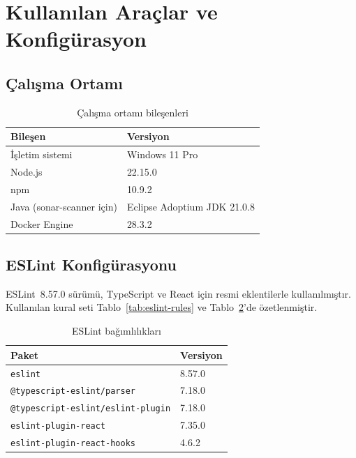 \documentclass[conference]{IEEEtran}
\begin{document}
\section{Kullanılan Araçlar ve Konfigürasyon}

\subsection{Çalışma Ortamı}

\begin{table}[htbp]
\caption{Çalışma ortamı bileşenleri}
\label{tab:env}
\centering
\begin{tabular}{@{}ll@{}}
\toprule
\textbf{Bileşen} & \textbf{Versiyon} \\
\midrule
İşletim sistemi & Windows 11 Pro \\
Node.js & 22.15.0 \\
npm & 10.9.2 \\
Java (sonar-scanner için) & Eclipse Adoptium JDK 21.0.8 \\
Docker Engine & 28.3.2 \\
\bottomrule
\end{tabular}
\end{table}

\subsection{ESLint Konfigürasyonu}

ESLint~8.57.0 sürümü, TypeScript ve React için resmi eklentilerle
kullanılmıştır. Kullanılan kural seti Tablo~\ref{tab:eslint-rules}
ve Tablo~\ref{tab:eslint-deps}'de özetlenmiştir.

\begin{table}[htbp]
\caption{ESLint bağımlılıkları}
\label{tab:eslint-deps}
\centering
\begin{tabular}{@{}ll@{}}
\toprule
\textbf{Paket} & \textbf{Versiyon} \\
\midrule
\texttt{eslint} & 8.57.0 \\
\texttt{@typescript-eslint/parser} & 7.18.0 \\
\texttt{@typescript-eslint/eslint-plugin} & 7.18.0 \\
\texttt{eslint-plugin-react} & 7.35.0 \\
\texttt{eslint-plugin-react-hooks} & 4.6.2 \\
\bottomrule
\end{tabular}
\end{table}
\end{document}
